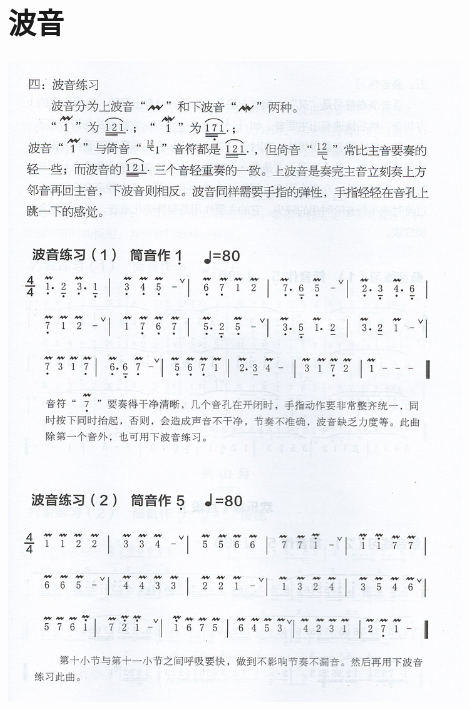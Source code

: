 \documentclass[cn,pad,twocol]{elegantbook}
\begin{document}
\section{波音}                  \includegraphics[width=0.9\textwidth]{dongxiao/Scan 10.jpeg}
\end{document}
